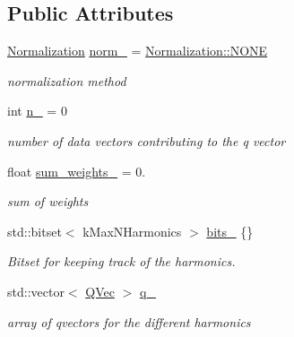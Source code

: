 \subsection*{Public Attributes}
\begin{DoxyCompactItemize}
\item 
\mbox{\label{classQn_1_1QVector_a5965054064d1ca1befc4301c949f68b0}} 
\mbox{\hyperlink{classQn_1_1CorrectionQnVector_a2998fe4babb716c57848c8c73b24a398}{Normalization}} \mbox{\hyperlink{classQn_1_1QVector_a5965054064d1ca1befc4301c949f68b0}{norm\+\_\+}} = \mbox{\hyperlink{classQn_1_1CorrectionQnVector_a2998fe4babb716c57848c8c73b24a398ab50339a10e1de285ac99d4c3990b8693}{Normalization\+::\+N\+O\+NE}}
\begin{DoxyCompactList}\small\item\em normalization method \end{DoxyCompactList}\item 
\mbox{\label{classQn_1_1QVector_ad4b87427b99ce27248349f09551308a0}} 
int \mbox{\hyperlink{classQn_1_1QVector_ad4b87427b99ce27248349f09551308a0}{n\+\_\+}} = 0
\begin{DoxyCompactList}\small\item\em number of data vectors contributing to the q vector \end{DoxyCompactList}\item 
\mbox{\label{classQn_1_1QVector_afeafdad3852cac5494d9e8ec3bc4eac5}} 
float \mbox{\hyperlink{classQn_1_1QVector_afeafdad3852cac5494d9e8ec3bc4eac5}{sum\+\_\+weights\+\_\+}} = 0.
\begin{DoxyCompactList}\small\item\em sum of weights \end{DoxyCompactList}\item 
\mbox{\label{classQn_1_1QVector_ad988fe1754a59a3a2756b7ad0d431dc4}} 
std\+::bitset$<$ k\+Max\+N\+Harmonics $>$ \mbox{\hyperlink{classQn_1_1QVector_ad988fe1754a59a3a2756b7ad0d431dc4}{bits\+\_\+}} \{\}
\begin{DoxyCompactList}\small\item\em Bitset for keeping track of the harmonics. \end{DoxyCompactList}\item 
\mbox{\label{classQn_1_1QVector_a0d926821d6272394717e94f920ee1dab}} 
std\+::vector$<$ \mbox{\hyperlink{structQn_1_1QVec}{Q\+Vec}} $>$ \mbox{\hyperlink{classQn_1_1QVector_a0d926821d6272394717e94f920ee1dab}{q\+\_\+}}
\begin{DoxyCompactList}\small\item\em array of qvectors for the different harmonics \end{DoxyCompactList}\end{DoxyCompactItemize}
